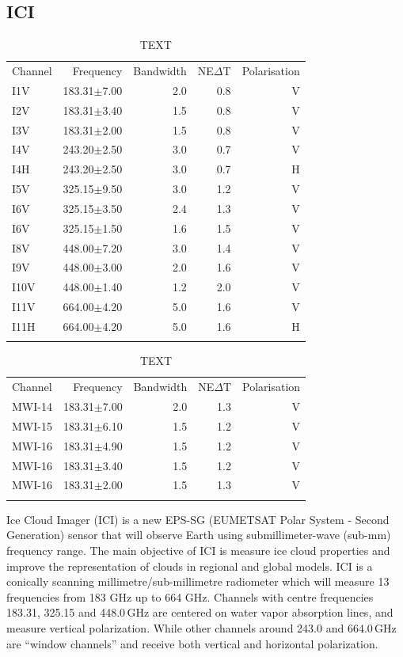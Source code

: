 \documentclass[amt, manuscript]{copernicus}
\begin{document}
\subsection{ICI}
%
\begin{table}[t]
	\label{tab:QRNN_models}	
	\caption{TEXT}
	\begin{tabular}{lrrrr}
		\tophline
		Channel & Frequency 	& Bandwidth  	&NE$\Delta$T	&Polarisation\\
		\middlehline
		I1V&	183.31$\pm$7.00    & 2.0 			& 0.8 		& V\\
		I2V&	183.31$\pm$3.40    & 1.5 			& 0.8 		& V\\
		I3V&	183.31$\pm$2.00    & 1.5 			& 0.8 		& V\\
		I4V&	243.20$\pm$2.50    & 3.0 			& 0.7 		& V\\
		I4H&	243.20$\pm$2.50    & 3.0 			& 0.7 		& H\\
		I5V&	325.15$\pm$9.50    & 3.0 			& 1.2 		& V\\
		I6V&	325.15$\pm$3.50    & 2.4 			& 1.3 		& V\\
		I6V&	325.15$\pm$1.50    & 1.6 			& 1.5 		& V\\
		I8V&	448.00$\pm$7.20    & 3.0 			& 1.4 		& V\\
		I9V&	448.00$\pm$3.00    & 2.0 			& 1.6 		& V\\
		I10V&	448.00$\pm$1.40    & 1.2 			& 2.0 		& V\\
		I11V&	664.00$\pm$4.20    & 5.0 			& 1.6 		& V\\
		I11H&	664.00$\pm$4.20    & 5.0 			& 1.6 		& H\\		
		\bottomhline
	\end{tabular}
	\begin{tabular}{lrrrr}
		\tophline
		Channel & Frequency 	& Bandwidth  	&NE$\Delta$T	&Polarisation\\
		\middlehline
		MWI-14&	183.31$\pm$7.00    & 2.0 			& 1.3 		& V\\
		MWI-15&	183.31$\pm$6.10    & 1.5 			& 1.2 		& V\\
		MWI-16&	183.31$\pm$4.90    & 1.5 			& 1.2 		& V\\
		MWI-16&	183.31$\pm$3.40    & 1.5 			& 1.2 		& V\\
		MWI-16&	183.31$\pm$2.00    & 1.5 			& 1.3 		& V\\	
		\bottomhline
	\end{tabular}
	\belowtable{} %
\end{table}
Ice Cloud Imager (ICI) is a new EPS-SG (EUMETSAT Polar System - Second Generation) sensor that will observe  Earth using submillimeter-wave (sub-mm) frequency range. The main objective of ICI is measure ice cloud properties and improve the representation of clouds in regional and global models. ICI is a conically scanning millimetre/sub-millimetre radiometer which will measure 13 frequencies from 183 GHz up to 664 GHz. Channels with centre frequencies 183.31, 325.15 and 448.0\,GHz are centered on water vapor absorption lines, and measure vertical polarization. While other channels around 243.0 and 664.0\,GHz are ``window channels'' and receive both vertical and horizontal polarization. 
\end{document}
